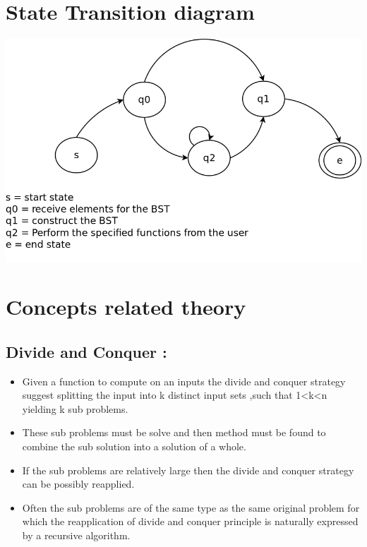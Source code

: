 \documentclass[10pt,a4paper]{article}
\begin{document}
\section{State Transition diagram}
\includegraphics[scale=0.30]{stdg.png}

\section{Concepts related theory}
\subsection{Divide and Conquer : }
\begin{itemize}
		\item Given a function to compute on an inputs the divide and conquer strategy suggest splitting the input into k distinct input sets ,such that 1<k<n yielding k sub problems.
		\item These sub problems must be solve and then method must be found to combine the sub solution into a solution of a whole.
		\item If the sub problems are relatively large then the divide and conquer strategy can be possibly reapplied.
		\item Often the sub problems are of the same type as the same original problem for which the reapplication of divide and conquer principle is naturally expressed by a recursive algorithm.
\end{itemize}
\end{document}
